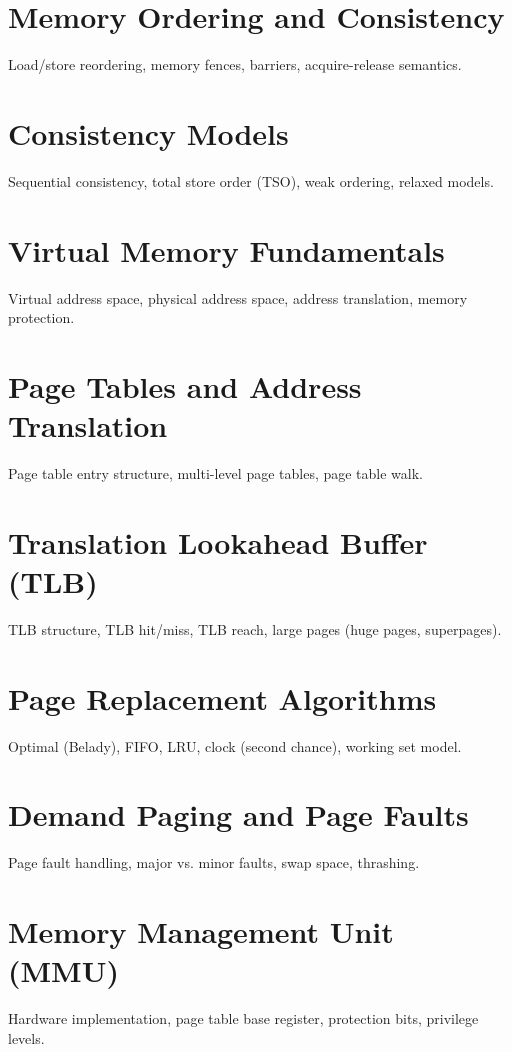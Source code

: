 \chapter{Memory Ordering and Consistency}
Load/store reordering, memory fences, barriers, acquire-release semantics.

\chapter{Consistency Models}
Sequential consistency, total store order (TSO), weak ordering, relaxed models.


\chapter{Virtual Memory Fundamentals}
Virtual address space, physical address space, address translation, memory protection.

\chapter{Page Tables and Address Translation}
Page table entry structure, multi-level page tables, page table walk.

\chapter{Translation Lookahead Buffer (TLB)}
TLB structure, TLB hit/miss, TLB reach, large pages (huge pages, superpages).

\chapter{Page Replacement Algorithms}
Optimal (Belady), FIFO, LRU, clock (second chance), working set model.

\chapter{Demand Paging and Page Faults}
Page fault handling, major vs. minor faults, swap space, thrashing.

\chapter{Memory Management Unit (MMU)}
Hardware implementation, page table base register, protection bits, privilege levels.

